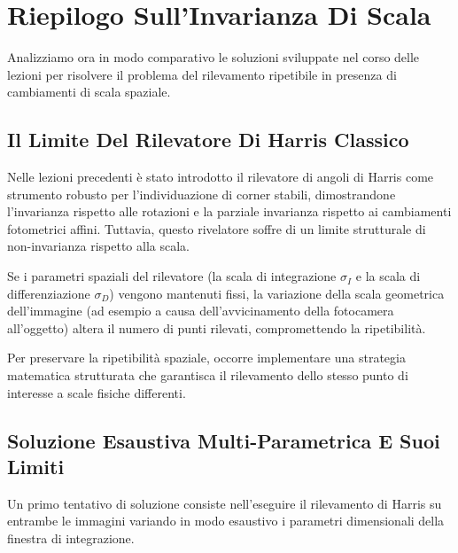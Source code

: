 ﻿\documentclass[11pt, a4paper]{article}
\begin{document}
\newpage

\section{Riepilogo Sull'Invarianza Di Scala}

Analizziamo ora in modo comparativo le soluzioni sviluppate nel corso delle lezioni per risolvere il problema del rilevamento ripetibile in presenza di cambiamenti di scala spaziale.

\subsection{Il Limite Del Rilevatore Di Harris Classico}

Nelle lezioni precedenti è stato introdotto il rilevatore di angoli di Harris come strumento robusto per l'individuazione di corner stabili, dimostrandone l'invarianza rispetto alle rotazioni e la parziale invarianza rispetto ai cambiamenti fotometrici affini. Tuttavia, questo rivelatore soffre di un limite strutturale di non-invarianza rispetto alla scala.


Se i parametri spaziali del rilevatore (la scala di integrazione $\sigma_I$ e la scala di differenziazione $\sigma_D$) vengono mantenuti fissi, la variazione della scala geometrica dell'immagine (ad esempio a causa dell'avvicinamento della fotocamera all'oggetto) altera il numero di punti rilevati, compromettendo la ripetibilità.


Per preservare la ripetibilità spaziale, occorre implementare una strategia matematica strutturata che garantisca il rilevamento dello stesso punto di interesse a scale fisiche differenti.

\subsection{Soluzione Esaustiva Multi-Parametrica E Suoi Limiti}

Un primo tentativo di soluzione consiste nell'eseguire il rilevamento di Harris su entrambe le immagini variando in modo esaustivo i parametri dimensionali della finestra di integrazione.
\end{document}
